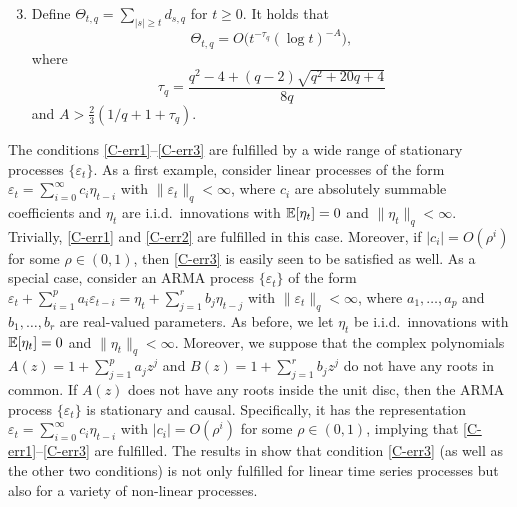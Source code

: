 \documentclass[a4paper,12pt]{article}
\numberwithin{equation}{section}
\begin{document}
\begin{enumerate}[label=(C\arabic*),leftmargin=1.05cm]
\setcounter{enumi}{2}

\item \label{C-err3} Define $\Theta_{t,q} = \sum\nolimits_{|s| \ge t} d_{s,q}$ for $t \ge 0$. It holds that 
\[ \Theta_{t,q} = O \big( t^{-\tau_q} (\log t)^{-A} \big), \]
where
\[ \tau_q = \frac{q^2 - 4 + (q-2) \sqrt{q^2 + 20q + 4}}{8q} \]
and $A > \frac{2}{3} (1/q + 1 + \tau_q)$. 

\end{enumerate}
The conditions \ref{C-err1}--\ref{C-err3} are fulfilled by a wide range of stationary processes $\{\varepsilon_t\}$. As a first example, consider linear processes of the form $\varepsilon_t = \sum\nolimits_{i=0}^{\infty} c_i \eta_{t-i}$ with $\| \varepsilon_t \|_q < \infty$, where $c_i$ are absolutely summable coefficients and $\eta_t$ are i.i.d.\ innovations with $\mathbb{E}[\eta_t] = 0$ and $\| \eta_t\|_q < \infty$. Trivially, \ref{C-err1} and \ref{C-err2} are fulfilled in this case. Moreover, if $|c_i| = O(\rho^i)$ for some $\rho \in (0,1)$, then \ref{C-err3} is easily seen to be satisfied as well. As a special case, consider an ARMA process $\{\varepsilon_t\}$ of the form $\varepsilon_t + \sum\nolimits_{i=1}^p a_i \varepsilon_{t-i} = \eta_t + \sum\nolimits_{j=1}^r b_j \eta_{t-j}$  with $\| \varepsilon_t \|_q < \infty$, where $a_1,\ldots,a_p$ and $b_1,\ldots,b_r$ are real-valued parameters. As before, we let $\eta_t$ be i.i.d.\ innovations with $\mathbb{E}[\eta_t] = 0$ and $\| \eta_t\|_q < \infty$. Moreover, we suppose that the complex polynomials $A(z) = 1 + \sum\nolimits_{j=1}^p a_jz^j$ and $B(z) = 1 + \sum\nolimits_{j=1}^r b_jz^j$ do not have any roots in common. If $A(z)$ does not have any roots inside the unit disc, then the ARMA process $\{ \varepsilon_t \}$ is stationary and causal. Specifically, it has the representation $\varepsilon_t = \sum\nolimits_{i=0}^{\infty} c_i \eta_{t-i}$ with $|c_i| = O(\rho^i)$ for some $\rho \in (0,1)$, implying that \ref{C-err1}--\ref{C-err3} are fulfilled. The results in \cite{WuShao2004} show that condition \ref{C-err3} (as well as the other two conditions) is not only fulfilled for linear time series processes but also for a variety of non-linear processes. 
\end{document}
